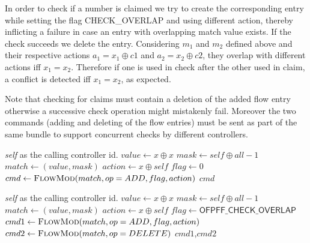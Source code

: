 \documentclass[conference]{sigcomm-alternate}
\newcommand{\concat}[0]{\oplus}
\newcommand{\claimcheck}{check\xspace}
\begin{document}
In order to check if a number is claimed we try to create the corresponding entry while setting the
flag \textsf{CHECK\_OVERLAP} and using different action, thereby inflicting a failure in case an entry with overlapping match value exists. If the check succeeds we delete the entry. Considering $m_1$ and $m_2$ defined above and their respective actions $a_1=x_1\concat c1$ and $a_2=x_2\concat c2$,  they overlap with different actions iff $x_1=x_2$. Therefore if one is used in \claimcheck after the other used in claim, a conflict is detected iff $x_1=x_2$, as expected.

Note that checking for claims must contain a deletion of the added flow entry otherwise a successive check operation might mistakenly fail. Moreover the two commands (adding and deleting of the flow entries) must be sent as part of the same bundle to support concurrent checks by different controllers.




\begin{algorithm}[t]
    \caption{$\textit{claim}(x)$}
    \label{alg:claim}
    \begin{algorithmic}[1]
    \Require \emph{self} as the calling controller id.
    		\State $value \gets x\concat x$
    		\State $mask \gets self\concat all-1$
	    	\State $match \gets (value,mask)$
    		\State $action \gets x\concat self$
    		\State $flag \gets 0$
    		\State $cmd\gets \textsc{FlowMod}(match, op = ADD, flag, action) $
			\Return $cmd$
    \end{algorithmic}
\end{algorithm}

\begin{algorithm}[t]
    \caption{$\textit{\claimcheck}(x)$}
    \label{alg:check}
    \begin{algorithmic}[1]
    \Require \emph{self} as the calling controller id.
    		\State $value \gets x\concat x$
    		\State $mask \gets self\concat all-1$
    		\State $match \gets (value,mask)$
    		\State $action \gets x\concat self$
    		\State $flag \gets \textsf{OFPFF\_CHECK\_OVERLAP}$
    		\State $cmd1\gets \textsc{FlowMod}(match, op = ADD, flag, action) $
    		\State $cmd2\gets \textsc{FlowMod}(match, op = DELETE) $
			\Return $cmd1$,$cmd2$
    \end{algorithmic}
\end{algorithm}
\end{document}
